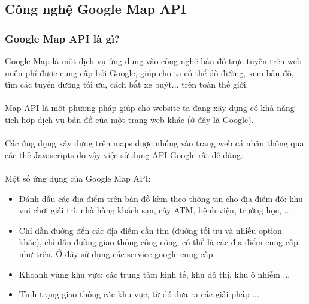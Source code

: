 \documentclass[a4paper]{article}
\begin{document}
\subsection{Công nghệ Google Map API}
\subsubsection{Google Map API là gì?}
Google Map là một dịch vụ ứng dụng vào công nghệ bản đồ trực tuyến trên web miễn phí được cung cấp bởi Google, giúp cho ta có thể dò đường, xem bản đồ, tìm các tuyến đường tối ưu, cách bắt xe buýt... trên toàn thế giới.\\
\\
Map API là một phương pháp giúp cho website ta đang xây dựng có khả năng tích hợp dịch vụ bản đồ của một trang web khác (ở đây là Google).\\
\\
Các ứng dụng xây dựng trên maps được nhúng vào trang web cá nhân thông qua các thẻ Javascripts do vậy việc sử dụng API Google rất dễ dàng.\\
\\
Một số ứng dụng của Google Map API:
\begin{itemize}    
    \item Đánh dấu các địa điểm trên bản đồ kèm theo thông tin cho địa điểm đó: khu vui chơi giải trí, nhà hàng khách sạn, cây ATM, bệnh viện, trường học, ...
    \item Chỉ dẫn đường đến các địa điểm cần tìm (đường tối ưu và nhiều option khác), chỉ dẫn đường giao thông công cộng, có thể là các địa điểm cung cấp như trên. Ở đây sử dụng các service google cung cấp.
    \item Khoanh vùng khu vực: các trung tâm kinh tế, khu đô thị, khu ô nhiễm ... 
    \item Tình trạng giao thông các khu vực, từ đó đưa ra các giải pháp ...    
\end{itemize}
\end{document}
